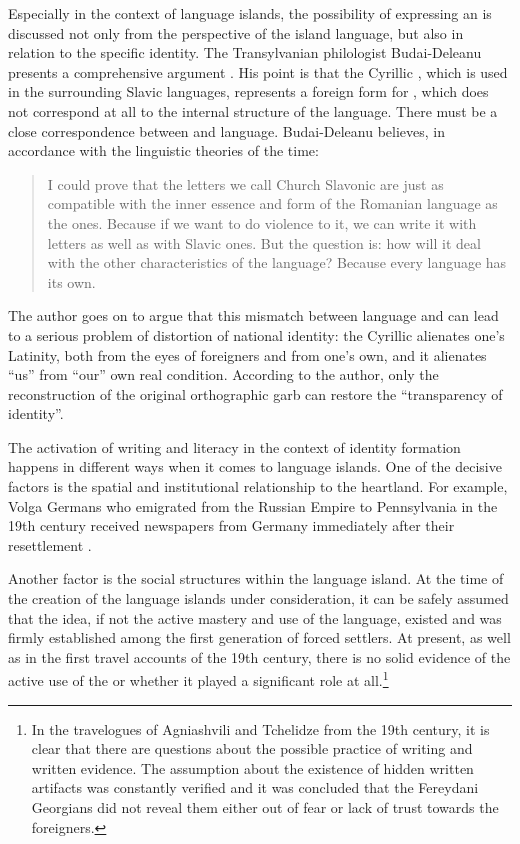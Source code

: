 \documentclass[output=paper,colorlinks,citecolor=brown,arabicfont,georgian]{langscibook}
\begin{document}
Especially in the context of language islands, the possibility of expressing an  is discussed not only from the perspective of the island language, but also in relation to the specific identity. The Transylvanian philologist Budai-Deleanu presents a comprehensive argument \citep{mitu2003}. His point is that the Cyrillic , which is used in the surrounding Slavic languages, represents a foreign form for , which does not correspond at all to the internal structure of the language. There must be a close correspondence between  and language. Budai-Deleanu believes, in accordance with the linguistic theories of the time:
\begin{quote}
I could prove that the letters we call Church Slavonic are just as compatible with the inner essence and form of the Romanian language as the  ones. Because if we want to do violence to it, we can write it with  letters as well as with Slavic ones. But the question is: how will it deal with the other characteristics of the language? Because every language has its own. \citep[111]{budai-deleanu1970} 
\end{quote}
The author goes on to argue that this mismatch between language and  can lead to a serious problem of distortion of national identity: the Cyrillic  alienates one's Latinity, both from the eyes of foreigners and from one's own, and it alienates ``us'' from ``our'' own real condition. According to the author, only the reconstruction of the original orthographic garb can restore the ``transparency of identity''.

The activation of writing and literacy in the context of identity formation happens in different ways when it comes to language islands. One of the decisive factors is the spatial and institutional relationship to the heartland. For example, Volga Germans who emigrated from the Russian Empire to Pennsylvania in the 19th century received  newspapers from Germany immediately after their resettlement \citep{mattheier1994}. 

Another factor is the social structures within the language island. At the time of the creation of the  language islands under consideration, it can be safely assumed that the idea, if not the active mastery and use of the  language, existed and was firmly established among the first generation of forced settlers. At present, as well as in the first travel accounts of the 19th century, there is no solid evidence of the active use of the   or whether it played a significant role at all.\footnote{%
In the travelogues of Agniashvili and Tchelidze from the 19th century, it is clear that there are questions about the possible practice of writing and written evidence. The assumption about the existence of hidden written artifacts was constantly verified and it was concluded that the Fereydani Georgians did not reveal them either out of fear or lack of trust towards the foreigners.}
\end{document}
